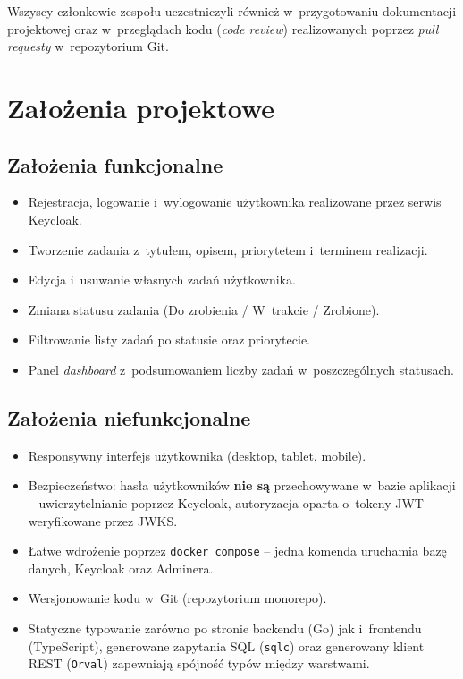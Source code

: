 \documentclass[12pt, a4paper, oneside]{article}
\begin{document}
Wszyscy członkowie zespołu uczestniczyli również w~przygotowaniu
dokumentacji projektowej oraz w~przeglądach kodu (\emph{code review})
realizowanych poprzez \emph{pull requesty} w~repozytorium Git.

\section{Założenia projektowe}

\subsection{Założenia funkcjonalne}
\begin{itemize}
  \item Rejestracja, logowanie i~wylogowanie użytkownika realizowane przez serwis Keycloak.
  \item Tworzenie zadania z~tytułem, opisem, priorytetem i~terminem realizacji.
  \item Edycja i~usuwanie własnych zadań użytkownika.
  \item Zmiana statusu zadania (Do zrobienia / W~trakcie / Zrobione).
  \item Filtrowanie listy zadań po statusie oraz priorytecie.
  \item Panel \emph{dashboard} z~podsumowaniem liczby zadań w~poszczególnych statusach.
\end{itemize}

\subsection{Założenia niefunkcjonalne}
\begin{itemize}
  \item Responsywny interfejs użytkownika (desktop, tablet, mobile).
  \item Bezpieczeństwo: hasła użytkowników \textbf{nie są} przechowywane
        w~bazie aplikacji -- uwierzytelnianie poprzez Keycloak,
        autoryzacja oparta o~tokeny JWT weryfikowane przez JWKS.
  \item Łatwe wdrożenie poprzez \texttt{docker compose} -- jedna komenda
        uruchamia bazę danych, Keycloak oraz Adminera.
  \item Wersjonowanie kodu w~Git (repozytorium monorepo).
  \item Statyczne typowanie zarówno po stronie backendu (Go) jak i~frontendu
        (TypeScript), generowane zapytania SQL (\texttt{sqlc}) oraz generowany
        klient REST (\texttt{Orval}) zapewniają spójność typów między warstwami.
\end{itemize}
\end{document}
